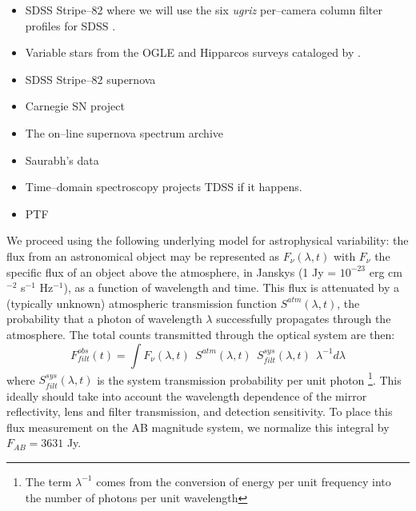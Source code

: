 \begin{itemize}


\item SDSS Stripe--82 where we will use the six {\it ugriz} per--camera column
filter profiles for SDSS \citep{2007AJ....134..973I}.

\item Variable stars from the OGLE and Hipparcos surveys cataloged by
\cite{2007A&A...475.1159D}.


\item SDSS Stripe--82 supernova

\item Carnegie SN project

\item The on--line supernova spectrum archive

\item Saurabh's data

\item Time--domain spectroscopy projects TDSS if it happens.


\item PTF

\end{itemize}


\smallskip

We proceed using the following underlying model for astrophysical variability:
the flux from an astronomical object may be represented as $F_\nu(\lambda, t)$
with $F_\nu$ the specific flux of an object above the atmosphere, in Janskys (1
Jy = $10^{-23}$ erg cm$^{-2}$ s$^{-1}$ Hz$^{-1}$), as a function of wavelength
and time.  This flux is attenuated by a (typically unknown) atmospheric
transmission function $S^{atm}(\lambda, t)$, the probability that a photon of
wavelength $\lambda$ successfully propagates through the atmosphere.  The total
counts transmitted through the optical system are then: $$F^{obs}_{filt} (t) =
\int F_\nu(\lambda, t) ~~ S^{atm}(\lambda, t) ~~ S^{sys}_{filt} (\lambda, t) ~~
\lambda^{-1} d\lambda$$ where $S^{sys}_{filt}(\lambda, t)$ is the system
transmission probability per unit photon \footnote{The term $\lambda^{-1}$ comes
from the conversion of energy per unit frequency into the number of photons per
unit wavelength}.   This ideally should take into account the wavelength
dependence of the mirror reflectivity, lens and filter transmission, and
detection sensitivity.  To place this flux measurement on the AB magnitude
system, we normalize this integral by $F_{AB} = 3631$ Jy.

